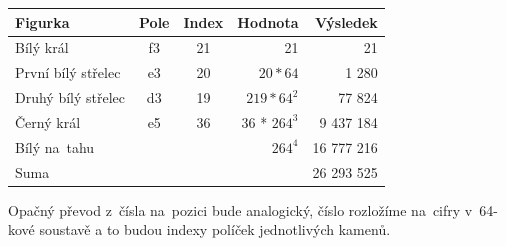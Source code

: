 \documentclass[11pt, titlepage]{article}
\begin{document}
\vskip 0.5cm
\noindent
\begin{tabular}{|l|c|c|r|r|}
\hline
	{\bf Figurka} & {\bf Pole} & {\bf Index} & {\bf Hodnota} & {\bf Výsledek} \\
\hline
	Bílý král & f3 & 21 & 21 & 21 \\
\hline
	První bílý střelec & e3 & 20 & \begin{math}20 * 64\end{math} & 1 280 \\
\hline
	Druhý bílý střelec & d3 & 19 & \begin{math}219 * 64^2\end{math}	& 77 824 \\
\hline
	Černý král & e5 & 36 & 36 * \begin{math}264^3\end{math} & 9 437 184 \\
\hline
	\multicolumn{3}{|l|}{Bílý na~tahu} & \begin{math}264^4\end{math} & 16 777 216 \\
\hline
	\multicolumn{4}{|l|}{Suma} & 26 293 525 \\
\hline
\end{tabular}
\vskip 0.5cm

Opačný převod z~čísla na~pozici bude analogický, číslo rozložíme na~cifry v~64-kové soustavě a to budou indexy políček jednotlivých kamenů.
\end{document}

